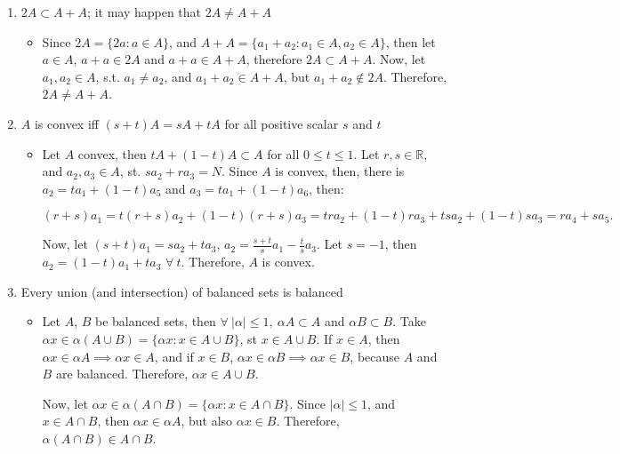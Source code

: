 \begin{enumerate}[label=(\alph*)]
\begin{itemize}
          \end{itemize}

    \item $2A \subset A+A$; it may happen that $2A\neq A+A$
          \begin{itemize}
              \item Since $2A=\{2a: a \in A\}$, and $A+A=\{a_1+a_2: a_1\in A, a_2\in A\}$, then let $a\in A$, $a+a\in 2A$ and $a+a\in A+A$, therefore $2A\subset A+A$. Now, let $a_1, a_2 \in A$, s.t. $a_1 \neq a_2$, and $a_1+a_2\in A+A$, but $a_1+a_2\notin 2A$. Therefore, $2A\neq A+A$.
          \end{itemize}

    \item $A$ is convex iff $(s+t)A=sA+tA$ for all positive scalar $s$ and $t$
          \begin{itemize}
              \item Let $A$ convex, then $tA+(1-t)A\subset A$ for all $0\leq t\leq 1$. Let $r,s\in\mathbb{R}$, and $a_2,a_3\in A$, st. $sa_2+ra_3=N$. Since $A$ is convex, then, there is $a_2=ta_1+(1-t)a_5$ and $a_3=ta_1+(1-t)a_6$, then:

                    $$
                        (r+s)a_1=
                        t(r+s)a_2+(1-t)(r+s)a_3=
                        tra_2+(1-t)ra_3+tsa_2+(1-t)sa_3=
                        ra_4+sa_5.
                    $$

                    Now, let $(s+t)a_1=sa_2+ta_3$, $a_2=\frac{s+t}{s}a_1-\frac{t}{s}a_3$. Let $s=-1$, then $a_2=(1-t)a_1+ta_3$ $\forall \ t$. Therefore, $A$ is convex.

          \end{itemize}

    \item Every union (and intersection) of balanced sets is balanced
        \begin{itemize}
            \item Let $A$, $B$ be balanced sets, then $\forall \ |\alpha|\leq 1, \ \alpha A\subset A$ and $\alpha B\subset B$. Take $\alpha x\in \alpha(A\cup B)=\{\alpha x:x\in A \cup B\}$, st $x\in A \cup B$. If $x\in A$, then $\alpha x \in \alpha A \implies \alpha x \in A$, and if $x\in B$, $\alpha x \in \alpha B \implies \alpha x \in B$, because $A$ and $B$ are balanced. Therefore, $\alpha x \in A\cup B$.

                Now, let $\alpha x\in\alpha(A\cap B)=\{\alpha x :x\in A \cap B\}$. Since $|\alpha|\leq 1$, and $x\in A\cap B$, then $\alpha x \in \alpha A$, but also $\alpha x \in B$. Therefore, $\alpha (A\cap B)\in A\cap B$.
        \end{itemize}


\end{enumerate}
